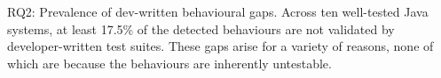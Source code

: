 \begin{rqbox}{RQ2: Prevalence of dev-written behavioural gaps.}
%
Across ten well-tested Java systems, at least 17.5\% of the detected behaviours are not validated by developer-written test suites. 
These gaps arise for a variety of reasons, none of which are because the behaviours are inherently untestable.
\end{rqbox}